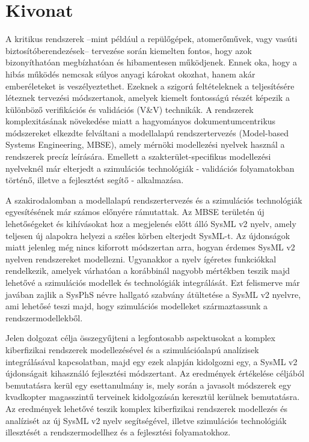 \setcounter{page}{1}

\selecthungarian

\chapter*{Kivonat}

A kritikus rendszerek --mint például a repülőgépek, atomerőművek, vagy vasúti biztosítóberendezések-- tervezése során kiemelten fontos, hogy azok bizonyíthatóan megbízhatóan és hibamentesen működjenek. Ennek oka, hogy a hibás működés nemcsak súlyos anyagi károkat okozhat, hanem akár emberéleteket is veszélyeztethet. Ezeknek a szigorú feltételeknek a teljesítésére léteznek tervezési módszertanok, amelyek kiemelt fontosságú részét képezik a különböző verifikációs és validációs (V\&V) technikák. A rendszerek komplexitásának növekedése miatt a hagyományos dokumentumcentrikus módszereket elkezdte felváltani a modellalapú rendszertervezés (Model-based Systems Engineering, MBSE), amely mérnöki modellezési nyelvek használ a rendszerek precíz leírására. Emellett a szakterület-specifikus modellezési nyelveknél már elterjedt a szimulációs technológiák - validációs folyamatokban történő, illetve a fejlesztést segítő - alkalmazása.

A szakirodalomban a modellalapú rendszertervezés és a szimulációs technológiák egyesítésének már számos előnyére rámutattak. Az MBSE területén új lehetőségeket és kihívásokat hoz a megjelenés előtt álló SysML v2 nyelv, amely teljesen új alapokra helyezi a széles körben elterjedt SysML-t. Az újdonságok miatt jelenleg még nincs kiforrott módszertan arra, hogyan érdemes SysML v2 nyelven rendszereket modellezni. Ugyanakkor a nyelv ígéretes funkciókkal rendelkezik, amelyek várhatóan a korábbinál nagyobb mértékben teszik majd lehetővé a szimulációs modellek és technológiák integrálását. Ezt felismerve már javában zajlik a SysPhS névre hallgató szabvány átültetése a SysML v2 nyelvre, ami lehetősé teszi majd, hogy szimulációs modelleket származtassunk a rendszermodellekből.

Jelen dolgozat célja összegyűjteni a legfontosabb aspektusokat a komplex kiberfizikai rendszerek modellezésével és a szimulációalapú analízisek integrálásával kapcsolatban, majd egy ezek alapján kidolgozni egy, a SysML v2 újdonságait kihasználó fejlesztési módszertant. Az eredmények  értékelése céljából bemutatásra kerül egy esettanulmány is, mely során a javasolt módszerek egy kvadkopter magasszintű terveinek kidolgozásán keresztül kerülnek bemutatásra. Az eredmények lehetővé teszik komplex kiberfizikai rendszerek modellezés és analízisét az új SysML v2 nyelv segítségével, illetve szimulációs technológiák illesztését a rendszermodellhez és a fejlesztési folyamatokhoz.

